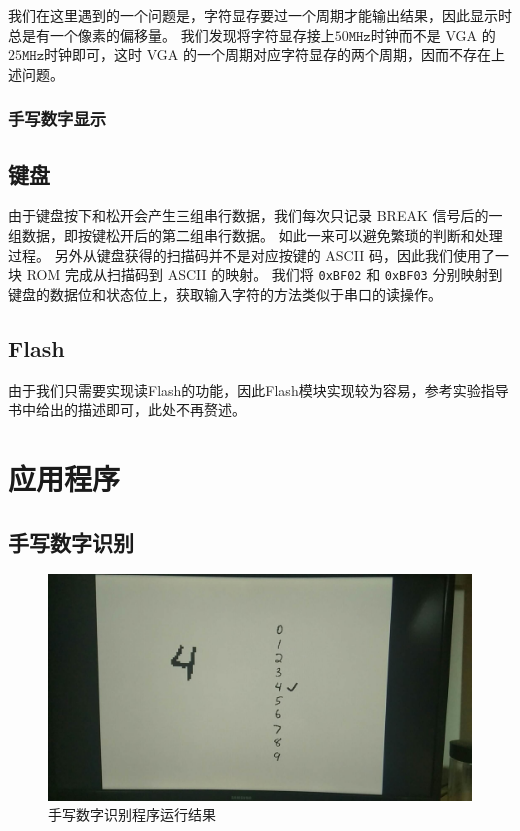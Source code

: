 \documentclass{article}
\begin{document}
我们在这里遇到的一个问题是，字符显存要过一个周期才能输出结果，因此显示时总是有一个像素的偏移量。
我们发现将字符显存接上$50\texttt{MHz}$时钟而不是 VGA 的$25\texttt{MHz}$时钟即可，这时 VGA 的一个周期对应字符显存的两个周期，因而不存在上述问题。

\subsubsection{手写数字显示}


\subsection{键盘}\label{sec:keyboard}

由于键盘按下和松开会产生三组串行数据，我们每次只记录 BREAK 信号后的一组数据，即按键松开后的第二组串行数据。
如此一来可以避免繁琐的判断和处理过程。
另外从键盘获得的扫描码并不是对应按键的 ASCII 码，因此我们使用了一块 ROM 完成从扫描码到 ASCII 的映射。
我们将 \texttt{0xBF02} 和 \texttt{0xBF03} 分别映射到键盘的数据位和状态位上，获取输入字符的方法类似于串口的读操作。

\subsection{Flash}

由于我们只需要实现读Flash的功能，因此Flash模块实现较为容易，参考实验指导书中给出的描述即可，此处不再赘述。

\section{应用程序}

\subsection{手写数字识别}

\begin{figure}[ht]
\centering
\includegraphics[width=\textwidth]{figures/mnist.png}
\caption{手写数字识别程序运行结果}
\label{fig:mnist}
\end{figure}
\end{document}
